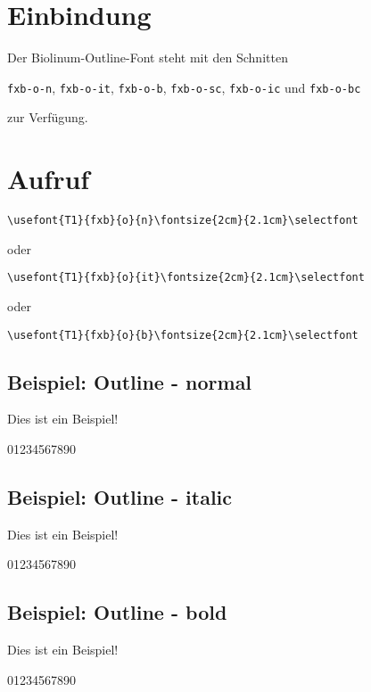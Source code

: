 \documentclass[ngerman]{libertinedoku}
\begin{document}

\section{Einbindung}

Der Biolinum-Outline-Font steht mit den Schnitten

\texttt{fxb-o-n}, \texttt{fxb-o-it}, \texttt{fxb-o-b}, \texttt{fxb-o-sc},
\texttt{fxb-o-ic} und \texttt{fxb-o-bc}

zur Verfügung.

\section{Aufruf}

\verb|\usefont{T1}{fxb}{o}{n}\fontsize{2cm}{2.1cm}\selectfont|

oder

\verb|\usefont{T1}{fxb}{o}{it}\fontsize{2cm}{2.1cm}\selectfont|

oder

\verb|\usefont{T1}{fxb}{o}{b}\fontsize{2cm}{2.1cm}\selectfont|


\subsection{Beispiel: Outline - normal}

{\fontsize{2cm}{2.1cm}\selectfont
Dies ist ein Beispiel!\par 01234567890\par}

\subsection{Beispiel: Outline - italic}

{\fontsize{2cm}{2.1cm}\selectfont
Dies ist ein Beispiel!\par\par 01234567890\par}

\subsection{Beispiel: Outline - bold}

{\fontsize{2cm}{2.1cm}\selectfont
Dies ist ein Beispiel!\par\par 01234567890\par}
\end{document}
